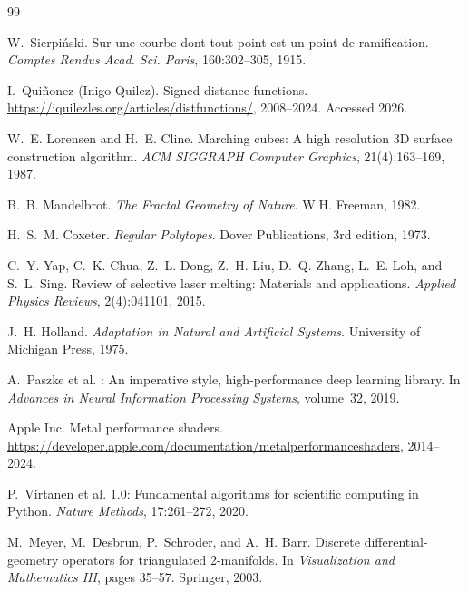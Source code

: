 \documentclass[11pt, a4paper]{article}
\begin{document}
\begin{thebibliography}{99}

W.~Sierpi\'nski.
\newblock Sur une courbe dont tout point est un point de ramification.
\newblock \emph{Comptes Rendus Acad. Sci. Paris}, 160:302--305, 1915.

I.~Qui\~{n}onez (Inigo Quilez).
\newblock Signed distance functions.
\newblock \url{https://iquilezles.org/articles/distfunctions/}, 2008--2024.
\newblock Accessed 2026.

W.~E. Lorensen and H.~E. Cline.
\newblock Marching cubes: A high resolution 3D surface construction algorithm.
\newblock \emph{ACM SIGGRAPH Computer Graphics}, 21(4):163--169, 1987.

B.~B. Mandelbrot.
\newblock \emph{The Fractal Geometry of Nature}.
\newblock W.H. Freeman, 1982.

H.~S.~M. Coxeter.
\newblock \emph{Regular Polytopes}.
\newblock Dover Publications, 3rd edition, 1973.

C.~Y. Yap, C.~K. Chua, Z.~L. Dong, Z.~H. Liu, D.~Q. Zhang, L.~E. Loh, and
  S.~L. Sing.
\newblock Review of selective laser melting: Materials and applications.
\newblock \emph{Applied Physics Reviews}, 2(4):041101, 2015.

J.~H. Holland.
\newblock \emph{Adaptation in Natural and Artificial Systems}.
\newblock University of Michigan Press, 1975.

A.~Paszke et al.
: An imperative style, high-performance deep learning
  library.
\newblock In \emph{Advances in Neural Information Processing Systems},
  volume~32, 2019.

Apple Inc.
\newblock Metal performance shaders.
\newblock \url{https://developer.apple.com/documentation/metalperformanceshaders},
  2014--2024.

P.~Virtanen et al.
 1.0: Fundamental algorithms for scientific computing in
  Python.
\newblock \emph{Nature Methods}, 17:261--272, 2020.

M.~Meyer, M.~Desbrun, P.~Schr\"{o}der, and A.~H. Barr.
\newblock Discrete differential-geometry operators for triangulated
  2-manifolds.
\newblock In \emph{Visualization and Mathematics III}, pages 35--57. Springer,
  2003.


\end{thebibliography}
\end{document}
